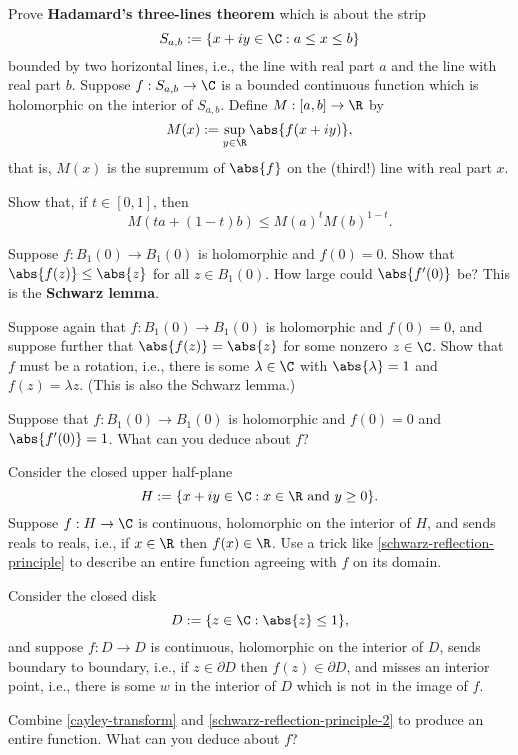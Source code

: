 \documentclass{homework}
\begin{document}
\begin{problem}\label{hadamard-three-lines}Prove \textbf{Hadamard's
    three-lines theorem} which is about the strip
  \[
    S_{a,b} := \{ x+iy \in \C : a \leq x \leq b\}
  \]
  bounded by two horizontal lines, i.e., the line with real part $a$
  and the line with real part $b$.  Suppose $f : S_{a,b} \to \C$ is a
  bounded continuous function which is holomorphic on the interior of
  $S_{a,b}$.  Define $M : [a,b] \to \R$ by
  \[
    M(x) := \sup_{y \in \R} \abs{f(x+iy)},
  \]
  that is, $M(x)$ is the supremum of $\abs{f}$ on the (third!) line with real part $x$.
  
  Show that, if $t \in [0,1]$, then \[
    M\left( ta + (1-t)b \right) \leq M(a)^t M(b)^{1-t}.
  \]
\end{problem}

\begin{problem}\label{schwarz-lemma}Suppose $f : B_1(0) \to B_1(0)$ is holomorphic and $f(0) = 0$.  Show
  that $\abs{f(z)} \leq \abs{z}$ for all $z \in B_1(0)$.  How large
  could $\abs{f'(0)}$ be?  This is the \textbf{Schwarz lemma}.
\end{problem}

\begin{problem}\label{schwarz-lemma-2}Suppose again that $f : B_1(0) \to B_1(0)$ is holomorphic and $f(0) = 0$, and
  suppose further that $\abs{f(z)} = \abs{z}$ for some nonzero
  $z \in \C$.  Show that $f$ must be a rotation, i.e., there is some
  $\lambda \in \C$ with $\abs{\lambda} = 1$ and $f(z) = \lambda z$.
  (This is also the Schwarz lemma.)
\end{problem}

\begin{problem}\label{schwarz-lemma-3}Suppose that
  $f : B_1(0) \to B_1(0)$ is holomorphic and $f(0) = 0$ and $\abs{f'(0)} = 1$.  What
  can you deduce about $f$?
\end{problem}

\begin{problem}\label{schwarz-reflection-principle-2}Consider the
  closed upper half-plane
  \[
    H := \{ x + iy \in \C : x \in \R \mbox{ and } y \geq 0 \}.
  \]
  Suppose $f : H \to \C$ is continuous, holomorphic on the interior of
  $H$, and sends reals to reals, i.e., if $x \in \R$ then
  $f(x) \in \R$.  Use a trick like \ref{schwarz-reflection-principle}
  to describe an entire function agreeing with $f$ on its domain.
\end{problem}

\begin{problem}Consider the closed disk
  \[
    D := \{ z \in \C : \abs{z} \leq 1 \},
  \]
  and suppose $f : D \to D$ is continuous, holomorphic on the interior
  of $D$, sends boundary to boundary, i.e., if $z \in \partial D$ then
  $f(z) \in \partial D$, and misses an interior point, i.e., there is
  some $w$ in the interior of $D$ which is not in the image of $f$.

  Combine \ref{cayley-transform} and
  \ref{schwarz-reflection-principle-2} to produce an entire function.
  What can you deduce about $f$?
\end{problem}
\end{document}
